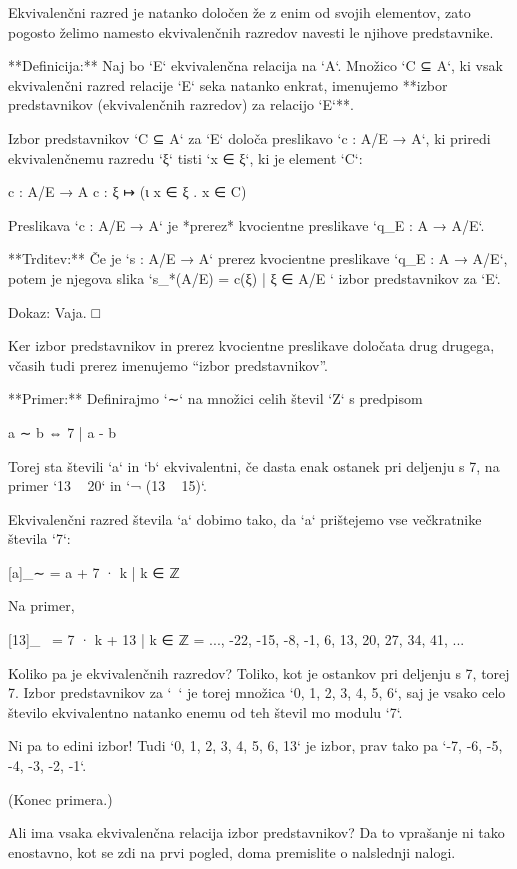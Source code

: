 Ekvivalenčni razred je natanko določen že z enim od svojih elementov, zato pogosto želimo
namesto ekvivalenčnih razredov navesti le njihove predstavnike.

**Definicija:** Naj bo `E` ekvivalenčna relacija na `A`. Množico `C ⊆ A`, ki vsak
ekvivalenčni razred relacije `E` seka natanko enkrat, imenujemo **izbor predstavnikov
(ekvivalenčnih razredov) za relacijo `E`**.

Izbor predstavnikov `C ⊆ A` za `E` določa preslikavo `c : A/E → A`, ki priredi
ekvivalenčnemu razredu `ξ` tisti `x ∈ ξ`, ki je element `C`:

    c : A/E → A
    c : ξ ↦ (ι x ∈ ξ . x ∈ C)

Preslikava `c : A/E → A` je *prerez* kvocientne preslikave `q_E : A → A/E`.

**Trditev:** Če je `s : A/E → A` prerez kvocientne preslikave `q_E : A → A/E`, potem je
njegova slika `s_*(A/E) = { c(ξ) | ξ ∈ A/E }` izbor predstavnikov za `E`.

Dokaz: Vaja. □

Ker izbor predstavnikov in prerez kvocientne preslikave določata drug drugega, včasih tudi
prerez imenujemo “izbor predstavnikov”.


**Primer:** Definirajmo `∼` na množici celih števil `Z` s predpisom

    a ∼ b ⇔ 7 | a - b

Torej sta števili `a` in `b` ekvivalentni, če dasta enak ostanek pri deljenju s 7,
na primer `13 ~ 20` in `¬ (13 ~ 15)`.

Ekvivalenčni razred števila `a` dobimo tako, da `a` prištejemo vse večkratnike števila `7`:

    [a]_∼ = { a + 7 · k | k ∈ ℤ }

Na primer,

    [13]_~ = { 7 · k + 13 | k ∈ ℤ }
           = { ..., -22, -15, -8, -1, 6, 13, 20, 27, 34, 41, ...}

Koliko pa je ekvivalenčnih razredov? Toliko, kot je ostankov pri deljenju s 7, torej 7.
Izbor predstavnikov za `~` je torej množica `{0, 1, 2, 3, 4, 5, 6}`, saj je vsako celo
število ekvivalentno natanko enemu od teh števil mo modulu `7`.

Ni pa to edini izbor! Tudi `{0, 1, 2, 3, 4, 5, 6, 13}` je izbor, prav tako pa `{-7, -6, -5, -4, -3, -2, -1}`.

(Konec primera.)

Ali ima vsaka ekvivalenčna relacija izbor predstavnikov? Da to vprašanje ni tako
enostavno, kot se zdi na prvi pogled, doma premislite o nalslednji nalogi.

